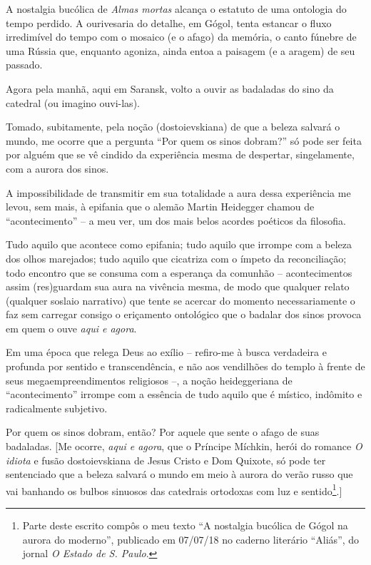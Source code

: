 A nostalgia bucólica de \emph{Almas mortas} alcança o estatuto de uma
ontologia do tempo perdido. A ourivesaria do detalhe, em Gógol, tenta
estancar o fluxo irredimível do tempo com o mosaico (e o afago) da
memória, o canto fúnebre de uma Rússia que, enquanto agoniza, ainda
entoa a paisagem (e a aragem) de seu passado.

Agora pela manhã, aqui em Saransk, volto a ouvir as badaladas do sino da
catedral (ou imagino ouvi-las).

Tomado, subitamente, pela noção (dostoievskiana) de que a beleza salvará
o mundo, me ocorre que a pergunta ``Por quem os sinos dobram?'' só pode
ser feita por alguém que se vê cindido da experiência mesma de
despertar, singelamente, com a aurora dos sinos.

A impossibilidade de transmitir em sua totalidade a aura dessa
experiência me levou, sem mais, à epifania que o alemão Martin Heidegger
chamou de ``acontecimento'' -- a meu ver, um dos mais belos acordes
poéticos da filosofia.

Tudo aquilo que acontece como epifania; tudo aquilo que irrompe com a
beleza dos olhos marejados; tudo aquilo que cicatriza com o ímpeto da
reconciliação; todo encontro que se consuma com a esperança da comunhão
-- acontecimentos assim (res)guardam sua aura na vivência mesma, de modo
que qualquer relato (qualquer soslaio narrativo) que tente se acercar do
momento necessariamente o faz sem carregar consigo o eriçamento
ontológico que o badalar dos sinos provoca em quem o ouve \emph{aqui e
agora}.

Em uma época que relega Deus ao exílio -- refiro-me à busca verdadeira e
profunda por sentido e transcendência, e não aos vendilhões do templo à
frente de seus megaempreendimentos religiosos --, a noção heideggeriana
de ``acontecimento'' irrompe com a essência de tudo aquilo que é
místico, indômito e radicalmente subjetivo.

Por quem os sinos dobram, então? Por aquele que sente o afago de suas
badaladas. {[}Me ocorre, \emph{aqui e agora}, que o Príncipe Míchkin,
herói do romance \emph{O idiota} e fusão dostoievskiana de Jesus Cristo
e Dom Quixote, só pode ter sentenciado que a beleza salvará o mundo em
meio à aurora do verão russo que vai banhando os bulbos sinuosos das
catedrais ortodoxas com luz e sentido\footnote{Parte deste escrito
  compôs o meu texto ``A nostalgia bucólica de Gógol na aurora do
  moderno'', publicado em 07/07/18 no caderno literário ``Aliás'', do
  jornal \emph{O Estado de S. Paulo}.}.{]}

